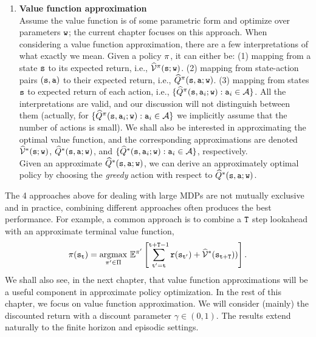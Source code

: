 \begin{enumerate}
\item \textbf{Value function approximation}\\
Assume the value function is of some parametric form and optimize over parameters ${\tt w}$; the current chapter focuses on this approach.
When considering a value function approximation, there are a few interpretations
of what exactly we mean. Given a policy $\pi$, it can either be: (1) mapping from a state
${\tt s}$ to its expected return, i.e.,
$\widehat{\mathcal{V}}^\pi({\tt s};{\tt w})$. (2) mapping from state-action
pairs $({\tt s},{\tt a})$ to their expected return, i.e.,
$\widehat{Q}^\pi({\tt s},{\tt a};{\tt w})$. (3) mapping from
states ${\tt s}$ to expected return of each action, i.e.,
$\{\widehat{Q}^\pi({\tt s},{\tt a}_i;{\tt w}):{\tt a}_i\in
\mathcal{A}\}$. All the interpretations are valid, and our
discussion will not distinguish between them (actually, for
$\{\widehat{Q}^\pi({\tt s},{\tt a}_i;{\tt w}):{\tt a}_i\in
\mathcal{A}\}$ we implicitly assume that the number of actions is
small). We shall also be interested in approximating the optimal value function, and the corresponding approximations are denoted $\widehat{\mathcal{V}}^*({\tt s};{\tt w})$, $\widehat{Q}^*({\tt s},{\tt a};{\tt w})$, and $\{\widehat{Q}^*({\tt s},{\tt a}_i;{\tt w}):{\tt a}_i\in
\mathcal{A}\}$, respectively.\\
Given an approximate $\widehat{Q}^*({\tt s},{\tt a};{\tt w})$, we can derive an approximately optimal policy by choosing the \emph{greedy} action with respect to $\widehat{Q}^*({\tt s},{\tt a};{\tt w})$.
\end{enumerate}

The 4 approaches above for dealing with large MDPs are not mutually exclusive and in practice, combining different approaches often produces the best performance. For example, a common approach is to combine a ${\tt T}$ step lookahead with an approximate terminal value function, 
\begin{equation*}
    \pi({\tt s}_{\tt t}) = \underset{\pi' \in \Pi}{\operatorname{argmax}}\  \mathbb{E}^{\pi'} \left[\sum_{{\tt t}'={\tt t}}^{{\tt t}+{\tt T}-1} {\tt r}({\tt s}_{{\tt t}'}) + \widehat{\mathcal{V}}^*({\tt s}_{{\tt t}+{\tt T}}))\right].
\end{equation*}
We shall also see, in the next chapter, that value function approximations will be a useful component in approximate policy optimization. In the rest of this chapter, we focus on value function approximation. 
We will consider (mainly) the discounted return with
a discount parameter $\gamma\in(0,1)$. The results extend 
naturally to the finite horizon and episodic settings.

